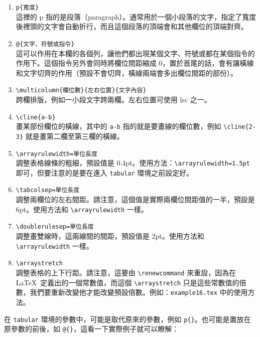 \begin{enumerate}
  \item \verb|p{寬度}|\\
        這裡的 {\ttfamily p} 指的是段落（paragraph）。通常用於一個小段落的文字，指定了寬度後裡頭的文字會自動折行，而且這個段落的頂端會和其他欄位的頂端對齊。
  \item \verb|@{文字、符號或指令}|\\
        這可以作用在本欄的各個列，讓他們都出現某個文字、符號或都在某個指令的作用下。這個指令另外會同時將欄位間距縮成 0，置於首尾的話，會有讓橫線和文字切齊的作用（預設不會切齊，橫線兩端會多出欄位間距的部份）。
  \item \verb|\multicolumn{欄位數}{左右位置}{文字內容}|\\
        跨欄排版，例如一小段文字跨兩欄。左右位置可使用 {\ttfamily lrc} 之一。
  \item \verb|\cline{a-b}|\\
        畫某部份欄位的橫線，其中的 \texttt{a-b} 指的就是要畫線的欄位數，例如 \verb|\cline{2-3}| 就是畫第二欄至第三欄的橫線。
  \item \verb|\arrayrulewidth=單位長度|\\
        調整表格線條的粗細，預設值是 0.4pt。使用方法：\verb|\arrayrulewidth=1.5pt| 即可，但要注意的是要在進入 \texttt{tabular} 環境之前設定好。
  \item \verb|\tabcolsep=單位長度|\\
        調整兩欄位的左右間距。請注意，這個值是實際兩欄位間距值的一半，預設是 6pt。使用方法和 \verb|\arrayrulewidth| 一樣。
  \item \verb|\doublerulesep=單位長度|\\
        調整畫雙線時，這兩線間的間距，預設值是 2pt。使用方法和 \verb|\arrayrulewidth| 一樣。
  \item \verb|\arraystretch|\\
        調整表格的上下行距。請注意，這要由 \verb|\renewcommand| 來重設，因為在 \LaTeX\ 定義出的一個常數值，而這個 \verb|\arraystretch| 只是這些常數值的倍數，我們要重新改變他才能改變預設倍數。例如：\texttt{example16.tex} 中的使用方法。
\end{enumerate}

在 \texttt{tabular} 環境的參數中，可能是取代原來的參數，例如 \verb|p{}|。也可能是置放在原參數的前後，如 \verb|@{}|，這看一下實際例子就可以瞭解：

